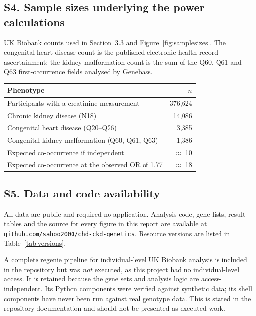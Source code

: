 \documentclass[11pt,a4paper]{article}
\begin{document}
\subsection*{S4. Sample sizes underlying the power calculations}

UK Biobank counts used in Section~3.3 and Figure~\ref{fig:samplesizes}. The congenital heart
disease count is the published electronic-health-record ascertainment; the kidney
malformation count is the sum of the Q60, Q61 and Q63 first-occurrence fields analysed by
Genebass.

\begin{table}[htbp]
\centering
\small
\begin{tabular}{lr}
\toprule
Phenotype & $n$ \\
\midrule
Participants with a creatinine measurement & 376,624 \\
Chronic kidney disease (N18) & 14,086 \\
Congenital heart disease (Q20--Q26) & 3,385 \\
Congenital kidney malformation (Q60, Q61, Q63) & 1,386 \\
Expected co-occurrence if independent & $\approx$ 10 \\
Expected co-occurrence at the observed OR of 1.77 & $\approx$ 18 \\
\bottomrule
\end{tabular}
\end{table}

\subsection*{S5. Data and code availability}

All data are public and required no application. Analysis code, gene lists, result tables
and the source for every figure in this report are available at
\texttt{github.com/sahoo2000/chd-ckd-genetics}. Resource versions are listed in
Table~\ref{tab:versions}.

A complete regenie \cite{mbatchou2021} pipeline for individual-level UK Biobank analysis is
included in the repository but was \emph{not} executed, as this project had no
individual-level access. It is retained because the gene sets and analysis logic are
access-independent. Its Python components were verified against synthetic data; its shell
components have never been run against real genotype data. This is stated in the repository
documentation and should not be presented as executed work.
\end{document}
